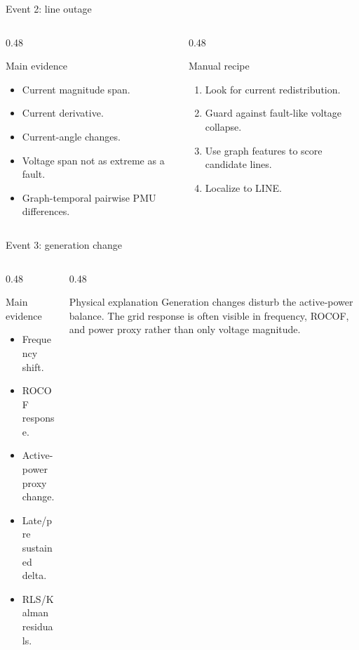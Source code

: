 \documentclass[10pt,aspectratio=169]{beamer}
\begin{document}
\begin{frame}{Event 2: line outage}
\small
\begin{columns}[T,totalwidth=\textwidth]
\begin{column}{0.48\textwidth}
\begin{block}{Main evidence}
\begin{itemize}
  \item Current magnitude span.
  \item Current derivative.
  \item Current-angle changes.
  \item Voltage span not as extreme as a fault.
  \item Graph-temporal pairwise PMU differences.
\end{itemize}
\end{block}
\end{column}
\begin{column}{0.48\textwidth}
\begin{alertblock}{Manual recipe}
\begin{enumerate}
  \item Look for current redistribution.
  \item Guard against fault-like voltage collapse.
  \item Use graph features to score candidate lines.
  \item Localize to LINE.
\end{enumerate}
\end{alertblock}
\end{column}
\end{columns}
\end{frame}

\begin{frame}{Event 3: generation change}
\small
\begin{columns}[T,totalwidth=\textwidth]
\begin{column}{0.48\textwidth}
\begin{block}{Main evidence}
\begin{itemize}
  \item Frequency shift.
  \item ROCOF response.
  \item Active-power proxy change.
  \item Late/pre sustained delta.
  \item RLS/Kalman residuals.
\end{itemize}
\end{block}
\end{column}
\begin{column}{0.48\textwidth}
\begin{exampleblock}{Physical explanation}
Generation changes disturb the active-power balance. The grid response is often visible in frequency, ROCOF, and power proxy rather than only voltage magnitude.
\end{exampleblock}
\end{column}
\end{columns}
\end{frame}
\end{document}
